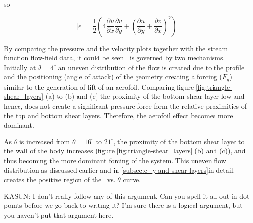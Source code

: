 so

\begin{equation}
  |\epsilon| = \frac{1}{2}\left(4\frac{\partial u}{\partial x}\frac{\partial v}{\partial y} + \left(\frac{\partial u}{\partial y} + \frac{\partial v}{\partial x}\right)^2\right)
\end{equation}

By comparing the pressure and the velocity plots together with the stream function flow-field data, it could be seen \cy\ is governed by two mechanisms. Initially at $\theta= 4^{\circ}$ an uneven distribution of the flow is created due to the profile and the positioning (angle of attack) of the geometry creating a forcing ($F_{y}$) similar to the generation of lift of an aerofoil. Comparing figure \ref{fig:triangle-shear_layers} (a) to (b) and (c) the proximity of the bottom shear layer low and hence, does not create a significant pressure force form the relative proximities of the top and bottom shear layers. Therefore, the aerofoil effect becomes more dominant.  

As $\theta$ is increased from $\theta=16^{\circ}$ to $21^{\circ}$, the proximity of the bottom shear layer to the wall of the body increases (figure \ref{fig:triangle-shear_layers} (b) and (c)), and thus becoming the more dominant forcing of the system. This uneven flow distribution as discussed earlier and in \ref{subsec:c_y and shear layers}in detail, creates the positive region of the \cy\ vs. $\theta$ curve.

KASUN: I don't really follow any of this argument. Can you spell it all out in dot points before we go back to writing it? I'm sure there is a logical argument, but you haven't put that argument here.
 
 
 
 
 




